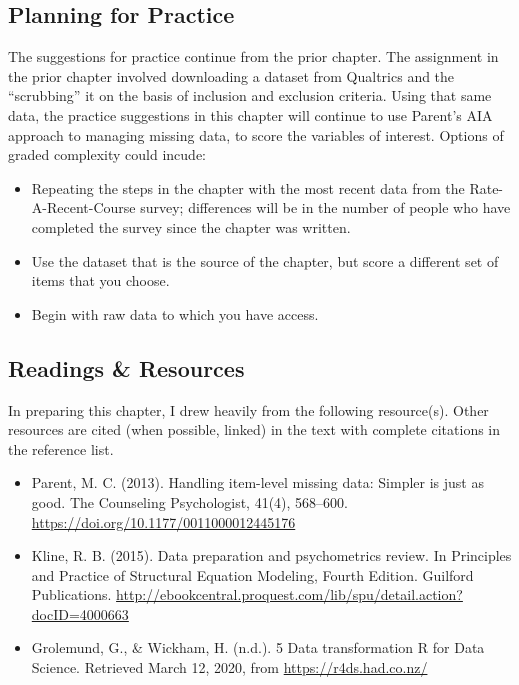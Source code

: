 \documentclass[
]{book}
\providecommand{\tightlist}{%
  \setlength{\itemsep}{0pt}\setlength{\parskip}{0pt}}
\begin{document}
\hypertarget{planning-for-practice-1}{%
\subsection{Planning for Practice}\label{planning-for-practice-1}}

The suggestions for practice continue from the prior chapter. The assignment in the prior chapter involved downloading a dataset from Qualtrics and the ``scrubbing'' it on the basis of inclusion and exclusion criteria. Using that same data, the practice suggestions in this chapter will continue to use Parent's \citeyearpar{parent_handling_2013} AIA approach to managing missing data, to score the variables of interest. Options of graded complexity could incude:

\begin{itemize}
\tightlist
\item
  Repeating the steps in the chapter with the most recent data from the Rate-A-Recent-Course survey; differences will be in the number of people who have completed the survey since the chapter was written.
\item
  Use the dataset that is the source of the chapter, but score a different set of items that you choose.
\item
  Begin with raw data to which you have access.
\end{itemize}

\hypertarget{readings-resources-1}{%
\subsection{Readings \& Resources}\label{readings-resources-1}}

In preparing this chapter, I drew heavily from the following resource(s). Other resources are cited (when possible, linked) in the text with complete citations in the reference list.

\begin{itemize}
\item
  Parent, M. C. (2013). Handling item-level missing data: Simpler is just as good. The Counseling Psychologist, 41(4), 568--600. \url{https://doi.org/10.1177/0011000012445176}
\item
  Kline, R. B. (2015). Data preparation and psychometrics review. In Principles and Practice of Structural Equation Modeling, Fourth Edition. Guilford Publications. \url{http://ebookcentral.proquest.com/lib/spu/detail.action?docID=4000663}
\item
  Grolemund, G., \& Wickham, H. (n.d.). 5 Data transformation \textbar{} R for Data Science. Retrieved March 12, 2020, from \url{https://r4ds.had.co.nz/}
\end{itemize}
\end{document}
